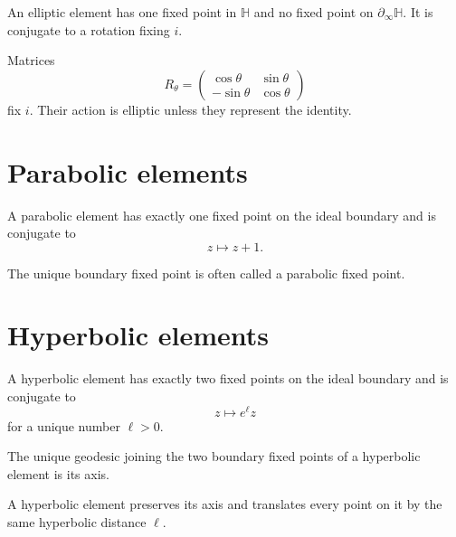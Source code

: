 \begin{theorem}\label{thm:vii34-elliptic}
An elliptic element has one fixed point in \(\mathbb H\) and no fixed point on
\(\partial_\infty\mathbb H\).  It is conjugate to a rotation fixing \(i\).
\end{theorem}

\begin{example}\label{ex:vii34-rotation}
Matrices
\[
R_\theta=
\begin{pmatrix}
\cos\theta&\sin\theta\\
-\sin\theta&\cos\theta
\end{pmatrix}
\]
fix \(i\).  Their action is elliptic unless they represent the identity.
\end{example}

\section{Parabolic elements}

\begin{theorem}\label{thm:vii34-parabolic}
A parabolic element has exactly one fixed point on the ideal boundary and is
conjugate to
\[
z\longmapsto z+1.
\]
\end{theorem}

The unique boundary fixed point is often called a parabolic fixed point.

\section{Hyperbolic elements}

\begin{theorem}\label{thm:vii34-hyperbolic}
A hyperbolic element has exactly two fixed points on the ideal boundary and is
conjugate to
\[
z\longmapsto e^\ell z
\]
for a unique number \(\ell>0\).
\end{theorem}

\begin{definition}[Axis]\label{def:vii34-axis}
The unique geodesic joining the two boundary fixed points of a hyperbolic element
is its axis.
\end{definition}

\begin{proposition}\label{prop:vii34-axis-translation}
A hyperbolic element preserves its axis and translates every point on it by the
same hyperbolic distance \(\ell\).
\end{proposition}

